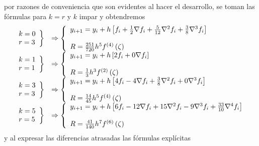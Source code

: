 \documentclass[spanish,titlepage,11pt]{article}
\begin{document}
por razones de conveniencia que son evidentes al hacer el desarrollo, se toman
las f\'{o}rmulas para $k=r$ y $k$ impar y obtendremos
\[%
\begin{array}
[c]{ll}%
\left.
\begin{array}
[c]{l}%
k=0\\
r=3
\end{array}
\right\}  & \Rightarrow\left\{
\begin{array}
[c]{l}%
y_{i+1}=y_{i}+h\left[  f_{i}+\frac{1}{2}\nabla f_{i}+\frac{5}{12}\nabla
^{2}f_{i}+\frac{3}{8}\nabla^{3}f_{i}\right] \\
\\
R=\frac{251}{720}h^{5}f^{(4)}\left(  \zeta\right)
\end{array}
\right. \\
\left.
\begin{array}
[c]{l}%
k=1\\
r=1
\end{array}
\right\}  & \Rightarrow\left\{
\begin{array}
[c]{l}%
y_{i+1}=y_{i}+h\left[  2f_{i}+0\nabla f_{i}\right] \\
\\
R=\frac{1}{3}h^{3}f^{(2)}\left(  \zeta\right)
\end{array}
\right. \\
\left.
\begin{array}
[c]{l}%
k=3\\
r=3
\end{array}
\right\}  & \Rightarrow\left\{
\begin{array}
[c]{l}%
y_{i+1}=y_{i}+h\left[  4f_{i}-4\nabla f_{i}+\frac{3}{8}\nabla^{2}f_{i}%
+0\nabla^{3}f_{i}\right] \\
\\
R=\frac{14}{45}h^{5}f^{(4)}\left(  \zeta\right)
\end{array}
\right. \\
\left.
\begin{array}
[c]{l}%
k=5\\
r=5
\end{array}
\right\}  & \Rightarrow\left\{
\begin{array}
[c]{l}%
y_{i+1}=y_{i}+h\left[  6f_{i}-12\nabla f_{i}+15\nabla^{2}f_{i}-9\nabla
^{3}f_{i}+\frac{33}{10}\nabla^{4}f_{i}\right] \\
\\
R=\frac{41}{140}h^{7}f^{(6)}\left(  \zeta\right)
\end{array}
\right.
\end{array}
\]
y al expresar las diferencias atrasadas las f\'{o}rmulas expl\'{i}citas
\end{document}
